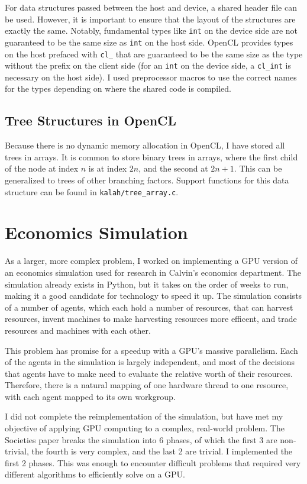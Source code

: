 \documentclass{article}
\begin{document}
For data structures passed between the host and device, a shared header file can be used. However, it is important to ensure that the layout of the structures are exactly the same. Notably, fundamental types like \texttt{int} on the device side are not guaranteed to be the same size as \texttt{int} on the host side. OpenCL provides types on the host prefaced with \texttt{cl\_} that are guaranteed to be the same size as the type without the prefix on the client side (for an \texttt{int} on the device side, a \texttt{cl\_int} is necessary on the host side). I used preprocessor macros to use the correct names for the types depending on where the shared code is compiled.

\subsection{Tree Structures in OpenCL}
Because there is no dynamic memory allocation in OpenCL, I have stored all trees in arrays. It is common to store binary trees in arrays, where the first child of the node at index $n$ is at index $2n$, and the second at $2n + 1$. This can be generalized to trees of other branching factors. Support functions for this data structure can be found in \texttt{kalah/tree\_array.c}.

\section{Economics Simulation}
As a larger, more complex problem, I worked on implementing a GPU version of an economics simulation used for research in Calvin's economics department.\cite{ditta13} The simulation already exists in Python, but it takes on the order of weeks to run, making it a good candidate for technology to speed it up. The simulation consists of a number of agents, which each hold a number of resources, that can harvest resources, invent machines to make harvesting resources more efficent, and trade resources and machines with each other.

This problem has promise for a speedup with a GPU's massive parallelism. Each of the agents in the simulation is largely independent, and most of the decisions that agents have to make need to evaluate the relative worth of their resources. Therefore, there is a natural mapping of one hardware thread to one resource, with each agent mapped to its own workgroup.

I did not complete the reimplementation of the simulation, but have met my objective of applying GPU computing to a complex, real-world problem. The Societies paper\cite{ditta13} breaks the simulation into 6 phases, of which the first 3 are non-trivial, the fourth is very complex, and the last 2 are trivial. I implemented the first 2 phases. This was enough to encounter difficult problems that required very different algorithms to efficiently solve on a GPU.
\end{document}
